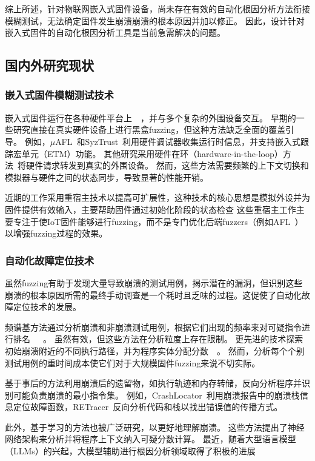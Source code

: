 综上所述，针对物联网嵌入式固件设备，尚未存在有效的自动化根因分析方法衔接模糊测试，无法确定固件发生崩溃崩溃的根本原因并加以修正。
因此，设计针对嵌入式固件的自动化根因分析工具是当前急需解决的问题。

\subsection{国内外研究现状}
\subsubsection{嵌入式固件模糊测试技术}
嵌入式固件运行在各种硬件平台上~\cite{IoTFuzzer2018}~\cite{SOBER}，并与多个复杂的外围设备交互。
早期的一些研究直接在真实硬件设备上进行黑盒fuzzing，但这种方法缺乏全面的覆盖引导。
例如，$\mu$AFL~\cite{mu2022}和SyzTrust~\cite{SyzTrust2023}利用硬件调试器收集运行时信息，并支持嵌入式跟踪宏单元（ETM\cite{Embedded2011}）功能。
其他研究采用硬件在环（hardware-in-the-loop）方法~\cite{SURROGATES}将硬件请求转发到真实的外围设备。
然而，这些方法需要频繁的上下文切换和模拟器与硬件之间的状态同步，导致显著的性能开销。

近期的工作采用重宿主技术以提高可扩展性，这种技术的核心思想是模拟外设并为固件提供有效输入，主要帮助固件通过初始化阶段的状态检查
这些重宿主工作主要专注于使IoT固件能够进行fuzzing，而不是专门优化后端fuzzers（例如AFL~\cite{AFL}）以增强fuzzing过程的效果。
\subsubsection{自动化故障定位技术}
虽然fuzzing有助于发现大量导致崩溃的测试用例，揭示潜在的漏洞，但识别这些崩溃的根本原因所需的最终手动调查是一个耗时且乏味的过程。这促使了自动化故障定位技术的发展。

频谱基方法通过分析崩溃和非崩溃测试用例，根据它们出现的频率来对可疑指令进行排名~\cite{Accuracy}~\cite{Evaluation2006}~\cite{Empirical2005}。
虽然有效，但这些方法在分析粒度上存在限制。
更先进的技术探索初始崩溃附近的不同执行路径，并为程序实体分配分数~\cite{AURORA}~\cite{Statistical2007}。
然而，分析每个个别测试用例的重时间成本使它们对于大规模固件fuzzing来说不切实际。

基于事后的方法利用崩溃后的遗留物，如执行轨迹和内存转储，反向分析程序并识别可能负责崩溃的最小指令集。
例如，CrashLocator~\cite{CrashLocator2014}利用崩溃报告中的崩溃栈信息定位故障函数，RETracer~\cite{RETracer2016}反向分析代码和栈以找出错误值的传播方式。

此外，基于学习的方法也被广泛研究，以更好地理解崩溃。
这些方法提出了神经网络架构来分析并将程序上下文纳入可疑分数计算。
最近，随着大型语言模型（LLMs）的兴起，大模型辅助进行根因分析领域取得了积极的进展~\cite{How2024}~\cite{Large2024}

